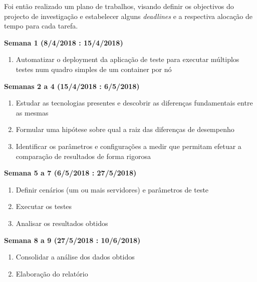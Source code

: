Foi então realizado um plano de trabalhos, visando definir os objectivos do projecto de investigação e estabelecer alguns \textit{deadlines} e a respectiva alocação de tempo para cada tarefa.

{}

\textbf{Semana 1 (8/4/2018 : 15/4/2018)}

\begin{enumerate}
\item Automatizar o deployment da aplicação de teste para  executar múltiplos testes num quadro simples de um container por nó
\end{enumerate}

\textbf{Semanas 2 a 4 (15/4/2018 : 6/5/2018)}


\begin{enumerate}
\item Estudar as tecnologias presentes e descobrir as diferenças fundamentais entre as mesmas
\item Formular uma hipótese sobre qual a  raiz das diferenças de desempenho
\item Identificar os parâmetros e configurações a medir que permitam efetuar a comparação de resultados de forma rigorosa

\end{enumerate}

\textbf{Semana 5 a 7 (6/5/2018 : 27/5/2018)}

\begin{enumerate}
\item Definir cenários (um ou mais servidores) e parâmetros de teste
\item Executar os testes
\item Analisar os resultados obtidos
\end{enumerate}


\textbf{Semana 8 a 9 (27/5/2018 : 10/6/2018)}

\begin{enumerate}
\item Consolidar a análise dos dados obtidos
\item Elaboração do relatório
\end{enumerate}
